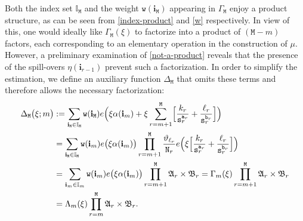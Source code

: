 \documentclass[12pt, twoside]{article}
\theoremstyle{definition}
\numberwithin{equation}{section}
\begin{document}
Both the index set $\mathbb I_{\mathtt M}$ and the weight $\mathtt w(\mathbf i_{\mathtt M})$ appearing in $\Gamma_{\mathtt M}$ enjoy a product structure, as can be seen from \eqref{index-product} and \eqref{w} respectively. In view of this, one would ideally like $\Gamma_{\mathtt M}(\xi)$ to factorize into a product of $(\mathtt M - m)$ factors, each corresponding to an elementary operation in the construction of $\mu$. However, a preliminary examination of \eqref{not-a-product} reveals that the presence of the spill-overs $\eta(\mathbf i_{r-1})$ prevent such a factorization. In order to simplify the estimation, we define an auxiliary function $\Delta_{\mathtt M}$ that omits these terms and therefore allows the necessary factorization: 
\begin{align} 
\Delta_{\mathtt M} \bigl(\xi;m\bigr)  &:=  \sum_{\mathbf i_{\mathtt M} \in \mathbb I_{\mathtt M}} \mathtt w(\mathbf i_{\mathtt M})  e\Bigl(\xi \alpha(\mathbf i_{m}) + \xi  \sum_{r=m+1}^{\mathtt M}  \Bigl[\frac{k_r}{\mathtt s_r^{\mathtt a_r}} + \frac{\ell_r}{\mathtt s_r^{\mathtt b_r}} \Bigr] \Bigr) \label{PsiM0} \\ 
&=\sum_{\mathbf i_{\mathtt M} \in \mathbb I_{\mathtt M}} \mathtt w(\mathbf i_{m})  e \bigl(\xi \alpha(\mathbf i_{m}) \bigr) \prod_{r=m+1}^{\mathtt M} \frac{\vartheta_{\ell_r}}{\mathtt N_r} e \Bigl( \xi \Bigl[  \frac{k_r}{\mathtt s_r^{\mathtt a_r}} + \frac{\ell_r}{\mathtt s_r^{\mathtt b_r}} \Bigr] \Bigr) \nonumber \\ 
 &= \sum_{\mathbf i_{m} \in \mathbb I_{m}} \mathtt w(\mathbf i_{m})  e \bigl(\xi \alpha(\mathbf i_{m}) \bigr) \prod_{r=m+1}^{\mathtt M} \mathfrak A_r \times \mathfrak B_r = \Gamma_m(\xi) \prod_{r=m+1}^{\mathtt M} \mathfrak A_r \times \mathfrak B_r \nonumber \\ &= \Lambda_m(\xi) \prod_{r=m}^{\mathtt M} \mathfrak A_r \times \mathfrak B_r.  \label{Psi-factors}
\end{align} 
\end{document}
